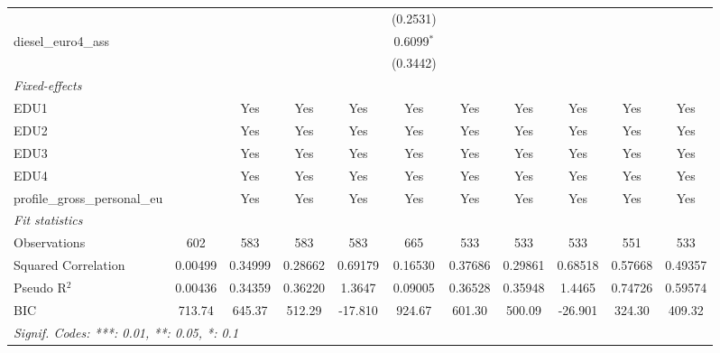 \begin{tabular}{lcccccccccc}
                                             &          &          &          &          & (0.2531)     &          &          &          &              &   \\   
   diesel\_euro4\_ass                        &          &          &          &          & 0.6099$^{*}$ &          &          &          &              &   \\   
                                             &          &          &          &          & (0.3442)     &          &          &          &              &   \\   
   \midrule
   \emph{Fixed-effects}\\
   EDU1                                      &          & Yes      & Yes      & Yes      & Yes          & Yes      & Yes      & Yes      & Yes          & Yes\\  
   EDU2                                      &          & Yes      & Yes      & Yes      & Yes          & Yes      & Yes      & Yes      & Yes          & Yes\\  
   EDU3                                      &          & Yes      & Yes      & Yes      & Yes          & Yes      & Yes      & Yes      & Yes          & Yes\\  
   EDU4                                      &          & Yes      & Yes      & Yes      & Yes          & Yes      & Yes      & Yes      & Yes          & Yes\\  
   profile\_gross\_personal\_eu              &          & Yes      & Yes      & Yes      & Yes          & Yes      & Yes      & Yes      & Yes          & Yes\\  
   \midrule
   \emph{Fit statistics}\\
   Observations                              & 602      & 583      & 583      & 583      & 665          & 533      & 533      & 533      & 551          & 533\\  
   Squared Correlation                       & 0.00499  & 0.34999  & 0.28662  & 0.69179  & 0.16530      & 0.37686  & 0.29861  & 0.68518  & 0.57668      & 0.49357\\  
   Pseudo R$^2$                              & 0.00436  & 0.34359  & 0.36220  & 1.3647   & 0.09005      & 0.36528  & 0.35948  & 1.4465   & 0.74726      & 0.59574\\  
   BIC                                       & 713.74   & 645.37   & 512.29   & -17.810  & 924.67       & 601.30   & 500.09   & -26.901  & 324.30       & 409.32\\  
   \midrule \midrule
   \multicolumn{11}{l}{\emph{Signif. Codes: ***: 0.01, **: 0.05, *: 0.1}}\\
\end{tabular}
\par\endgroup


